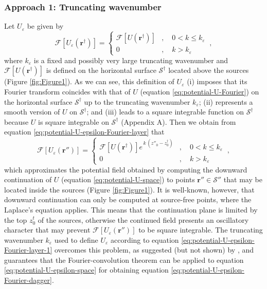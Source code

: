 \documentclass[manuscript,noblind]{geophysics}
\begin{document}
	\subsubsection{Approach 1: Truncating wavenumber}
	
	Let $U_{\varepsilon}$ be given by
	\begin{equation}
		\mathcal{F} [ U_{\varepsilon}(\mathbf{r}^{\dagger}) ] = 
		\begin{cases}
			\mathcal{F} [ U(\mathbf{r}^{\dagger}) ] &
			, \quad 0 < k \le k_{\varepsilon} \\
			0 & , \quad k > k_{\varepsilon} 
		\end{cases} \: ,
		\label{eq:potential-U-epsilon-Fourier-dagger-1}
	\end{equation}
	where $k_{\varepsilon}$ is a fixed and possibly very large truncating wavenumber and 
	$\mathcal{F} \left[ U(\mathbf{r}^{\dagger}) \right]$ is defined on the horizontal surface $\mathcal{S}^{\dagger}$ 
	located above the sources (Figure \ref{fig:Figure1}). 
	As we can see, this definition of $U_{\varepsilon}$ 
	(i) imposes that its Fourier transform coincides with 
	that of $U$ (equation \ref{eq:potential-U-Fourier}) on the horizontal surface $\mathcal{S}^{\dagger}$ 
	up to the truncating wavenumber $k_{\varepsilon}$; 
	(ii) represents a smooth version of $U$ on $\mathcal{S}^{\dagger}$; and
	(iii) leads to a square integrable function on $\mathcal{S}^{\dagger}$ because 
	$U$ is square integrable on $\mathcal{S}^{\dagger}$ (Appendix A).
	Then we obtain from equation \ref{eq:potential-U-epsilon-Fourier-layer} that 
	\begin{equation}
		\mathcal{F} \left[ U_{\varepsilon}(\mathbf{r}'') \right] = 
		\begin{cases}
			\mathcal{F} \left[ U(\mathbf{r}^{\dagger}) \right] 
			e^{\, k \, (z''_{0} - z^{\dagger}_{0})} & , 
			\quad 0 < k \le k_{\varepsilon} \\
			0 & , \quad k > k_{\varepsilon} 
		\end{cases} \: ,
		\label{eq:potential-U-epsilon-Fourier-layer-1}
	\end{equation}
	which approximates the potential field obtained by 
	computing the downward continuation of $U$ (equation \ref{eq:potential-U-space}) 
	to points $\mathbf{r}'' \in \mathcal{S}''$ that may be located inside the sources (Figure \ref{fig:Figure1}). 
	It is well-known, however, that downward continuation can only be computed at 
	source-free points, where the Laplace's equation applies. This means that the
	continuation plane is limited by the top $z^{t}_{0}$ of the sources, otherwise the continued field 
	presents an oscillatory character \citep[e.g.,][]{roy1967, fedi_florio2002} that may
	prevent $\mathcal{F} \left[ U_{\varepsilon}(\mathbf{r}'') \right]$ to be square integrable.
	The truncating wavenumber $k_{\varepsilon}$ used to define $U_{\varepsilon}$ according to equation 
	\ref{eq:potential-U-epsilon-Fourier-layer-1} overcomes this problem, as suggested (but not shown) 
	by \citet{bhattacharyya1967},
	and guarantees that the Fourier-convolution theorem can be applied to equation \ref{eq:potential-U-epsilon-space} 
	for obtaining equation \ref{eq:potential-U-epsilon-Fourier-dagger}.
	
\end{document}
